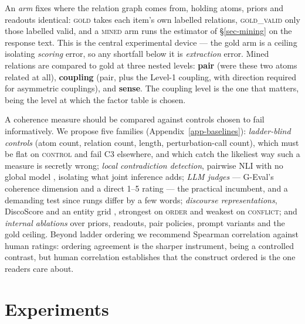 \documentclass{article} %
\begin{document}
An \emph{arm} fixes where the relation graph comes from, holding atoms, priors and readouts
identical: \textsc{gold} takes each item's own labelled relations, \textsc{gold\_valid} only those
labelled valid, and a \textsc{mined} arm runs the estimator of \S\ref{sec-mining} on the response
text. This is the central experimental device --- the gold arm is a ceiling isolating
\emph{scoring} error, so any shortfall below it is \emph{extraction} error. Mined relations are
compared to gold at three nested levels: \textbf{pair} (were these two atoms related at all),
\textbf{coupling} (pair, plus the Level-1 coupling, with direction required for asymmetric
couplings), and \textbf{sense}. The coupling level is the one that matters, being the level at
which the factor table is chosen.

A coherence measure should be compared against controls chosen to fail informatively. We propose
five families (Appendix~\ref{app-baselines}): \emph{ladder-blind controls} (atom count, relation
count, length, perturbation-call count), which must be flat on \textsc{control} and fail C3
elsewhere, and which catch the likeliest way such a measure is secretly wrong; \emph{local
contradiction detection}, pairwise NLI with no global model \citep{selfcheckgpt}, isolating what
joint inference adds; \emph{LLM judges} --- G-Eval's coherence dimension \citep{geval} and a direct
1--5 rating --- the practical incumbent, and a demanding test since rungs differ by a few words;
\emph{discourse representations}, DiscoScore \citep{discoscore} and an entity grid
\citep{barzilay}, strongest on \textsc{order} and weakest on \textsc{conflict}; and \emph{internal
ablations} over priors, readouts, pair policies, prompt variants and the gold ceiling. Beyond
ladder ordering we recommend Spearman correlation against human ratings: ordering agreement is the
sharper instrument, being a controlled contrast, but human correlation establishes that the
construct ordered is the one readers care about.

\section{Experiments}
\label{sec-experiments}
\end{document}
